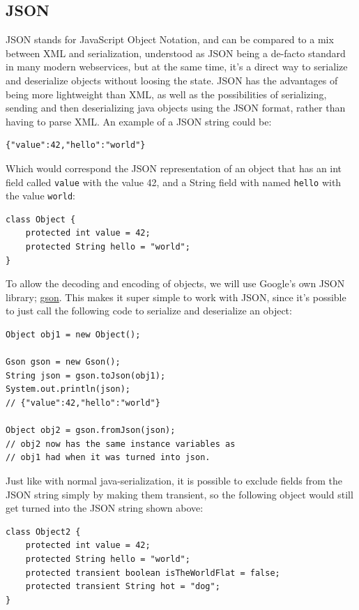 \documentclass{acm_proc_article-sp}
\begin{document}
\subsection{JSON}
\thispagestyle{fancy}%

JSON stands for JavaScript Object Notation, and can be compared to a mix between XML and serialization, understood as JSON being a de-facto standard in many modern webservices, but at the same time, it's a direct way to serialize and deserialize objects without loosing the state. JSON has the advantages of being more lightweight than XML, as well as the possibilities of serializing, sending and then deserializing java objects using the JSON format, rather than having to parse XML. An example of a JSON string could be:

\begin{verbatim}
{"value":42,"hello":"world"}
\end{verbatim}

Which would correspond the JSON representation of an object that has an int field called \texttt{value} with the value 42, and a String field with named \texttt{hello} with the value \texttt{world}:

\begin{verbatim}
class Object {
	protected int value = 42;
	protected String hello = "world";
}
\end{verbatim}

To allow the decoding and encoding of objects, we will use Google's own JSON library; \href{http://code.google.com/p/google-gson/}{gson}. This makes it super simple to work with JSON, since it's possible to just call the following code to serialize and deserialize an object:

\begin{verbatim}
Object obj1 = new Object();

Gson gson = new Gson();
String json = gson.toJson(obj1);
System.out.println(json); 
// {"value":42,"hello":"world"}

Object obj2 = gson.fromJson(json);
// obj2 now has the same instance variables as 
// obj1 had when it was turned into json.
\end{verbatim}

Just like with normal java-serialization, it is possible to exclude fields from the JSON string simply by making them transient, so the following object would still get turned into the JSON string shown above:

\begin{verbatim}
class Object2 {
	protected int value = 42;
	protected String hello = "world";
	protected transient boolean isTheWorldFlat = false;
	protected transient String hot = "dog";
}
\end{verbatim}
\end{document}
